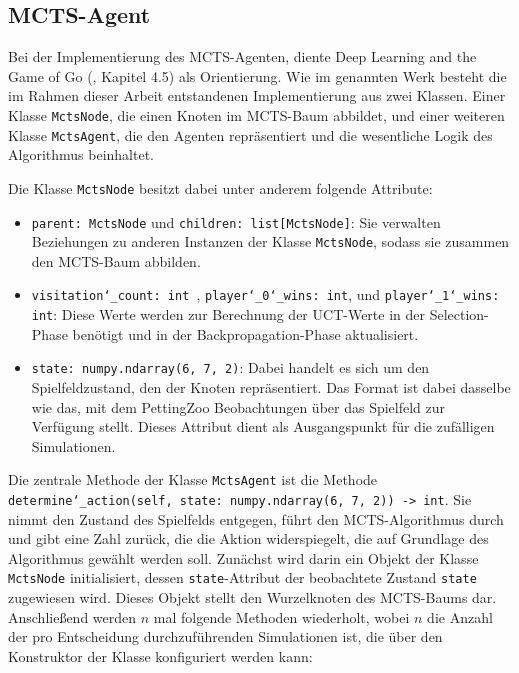 \subsection{MCTS-Agent}

Bei der Implementierung des MCTS-Agenten, diente \glqq Deep Learning and the Game of Go\grqq{} (\cite{Ferguson.January2019}, Kapitel 4.5) als Orientierung. Wie im genannten Werk besteht die im Rahmen dieser Arbeit entstandenen Implementierung aus zwei Klassen. Einer Klasse \texttt{MctsNode}, die einen Knoten im MCTS-Baum abbildet, und einer weiteren Klasse \texttt{MctsAgent}, die den Agenten repräsentiert und die wesentliche Logik des Algorithmus beinhaltet.

Die Klasse \texttt{MctsNode} besitzt dabei unter anderem folgende Attribute:
\begin{itemize}
\item \texttt{parent: MctsNode} und \texttt{children: list[MctsNode]}: Sie verwalten Beziehungen zu anderen Instanzen der Klasse \texttt{MctsNode}, sodass sie zusammen den MCTS-Baum abbilden.
\item \texttt{visitation\char`_count: int }, \texttt{player\char`_0\char`_wins: int}, und \texttt{player\char`_1\char`_wins: int}: Diese Werte werden zur Berechnung der UCT-Werte in der Selection-Phase benötigt und in der Backpropagation-Phase aktualisiert.
\item \texttt{state: numpy.ndarray(6, 7, 2)}: Dabei handelt es sich um den Spielfeldzustand, den der Knoten repräsentiert. Das Format ist dabei dasselbe wie das, mit dem PettingZoo Beobachtungen über das Spielfeld zur Verfügung stellt. Dieses Attribut dient als Ausgangspunkt für die zufälligen Simulationen.
\end{itemize}

Die zentrale Methode der Klasse \texttt{MctsAgent} ist die Methode \texttt{determine\char`_action(self, state: numpy.ndarray(6, 7, 2)) -> int}. Sie nimmt den Zustand des Spielfelds entgegen, führt den MCTS-Algorithmus durch und gibt eine Zahl zurück, die die Aktion widerspiegelt, die auf Grundlage des Algorithmus gewählt werden soll. Zunächst wird darin ein Objekt der Klasse \texttt{MctsNode} initialisiert, dessen \texttt{state}-Attribut der beobachtete Zustand \texttt{state} zugewiesen wird. Dieses Objekt stellt den Wurzelknoten des MCTS-Baums dar. Anschließend werden $n$ mal folgende Methoden wiederholt, wobei $n$ die Anzahl der pro Entscheidung durchzuführenden Simulationen ist, die über den Konstruktor der Klasse konfiguriert werden kann:

